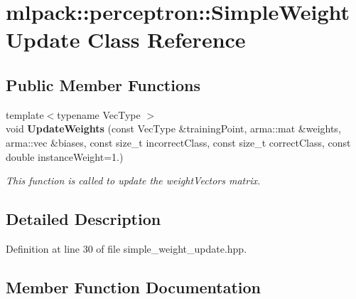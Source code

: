 \section{mlpack\+:\+:perceptron\+:\+:Simple\+Weight\+Update Class Reference}
\label{classmlpack_1_1perceptron_1_1SimpleWeightUpdate}
\subsection*{Public Member Functions}
\begin{DoxyCompactItemize}
\item 
{\footnotesize template$<$typename Vec\+Type $>$ }\\void {\bf Update\+Weights} (const Vec\+Type \&training\+Point, arma\+::mat \&weights, arma\+::vec \&biases, const size\+\_\+t incorrect\+Class, const size\+\_\+t correct\+Class, const double instance\+Weight=1.)
\begin{DoxyCompactList}\small\item\em This function is called to update the weight\+Vectors matrix. \end{DoxyCompactList}\end{DoxyCompactItemize}


\subsection{Detailed Description}


Definition at line 30 of file simple\+\_\+weight\+\_\+update.\+hpp.



\subsection{Member Function Documentation}
